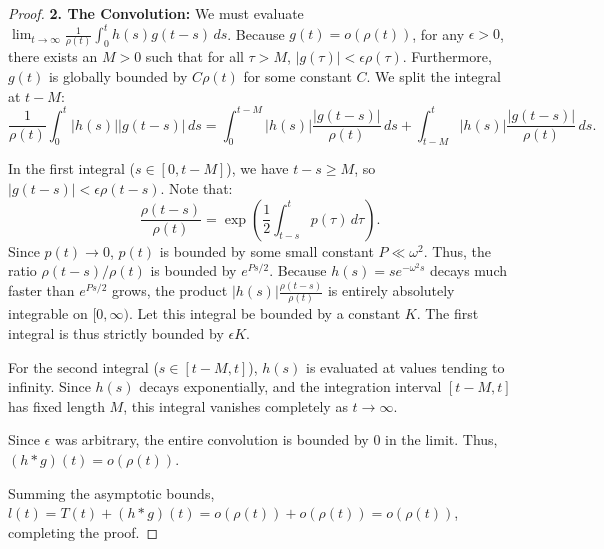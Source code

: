\documentclass[10pt,a4paper]{amsart}
\begin{document}
\begin{proof}
			\textbf{2. The Convolution:}
			We must evaluate $\lim_{t \to \infty} \frac{1}{\rho(t)} \int_0^t h(s) g(t-s) \, ds$.
			Because $g(t) = o(\rho(t))$, for any $\epsilon > 0$, there exists an $M > 0$ such that for all $\tau > M$, $|g(\tau)| < \epsilon \rho(\tau)$. Furthermore, $g(t)$ is globally bounded by $C \rho(t)$ for some constant $C$.
			We split the integral at $t-M$:
			\[ \frac{1}{\rho(t)} \int_0^t |h(s)| |g(t-s)| \, ds = \int_0^{t-M} |h(s)| \frac{|g(t-s)|}{\rho(t)} \, ds + \int_{t-M}^t |h(s)| \frac{|g(t-s)|}{\rho(t)} \, ds. \]
			
			In the first integral ($s \in [0, t-M]$), we have $t-s \ge M$, so $|g(t-s)| < \epsilon \rho(t-s)$. Note that:
			\[ \frac{\rho(t-s)}{\rho(t)} = \exp\left( \frac{1}{2}\int_{t-s}^t p(\tau)\,d\tau \right). \]
			Since $p(t) \to 0$, $p(t)$ is bounded by some small constant $P \ll \omega^2$. Thus, the ratio $\rho(t-s)/\rho(t)$ is bounded by $e^{Ps/2}$. Because $h(s) = s e^{-\omega^2 s}$ decays much faster than $e^{Ps/2}$ grows, the product $|h(s)|\frac{\rho(t-s)}{\rho(t)}$ is entirely absolutely integrable on $[0, \infty)$. Let this integral be bounded by a constant $K$. The first integral is thus strictly bounded by $\epsilon K$.
			
			For the second integral ($s \in [t-M, t]$), $h(s)$ is evaluated at values tending to infinity. Since $h(s)$ decays exponentially, and the integration interval $[t-M, t]$ has fixed length $M$, this integral vanishes completely as $t \to \infty$.
			
			Since $\epsilon$ was arbitrary, the entire convolution is bounded by $0$ in the limit. Thus, $(h * g)(t) = o(\rho(t))$.
			
			Summing the asymptotic bounds, $l(t) = T(t) + (h * g)(t) = o(\rho(t)) + o(\rho(t)) = o(\rho(t))$, completing the proof.
	\end{proof}
\end{document}
